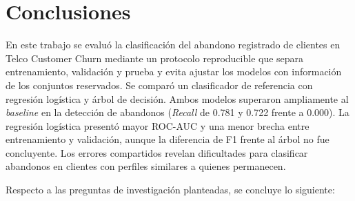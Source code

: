 \section{Conclusiones}
\label{sec:conclusiones}
En este trabajo se evaluó la clasificación del abandono registrado de clientes en Telco Customer Churn
mediante un protocolo reproducible que separa entrenamiento, validación y prueba y evita ajustar
los modelos con información de los conjuntos reservados. Se comparó un clasificador de referencia
con regresión logística y árbol de decisión. Ambos modelos superaron ampliamente al \emph{baseline} en la
detección de abandonos (\emph{Recall} de 0.781 y 0.722 frente a 0.000).
La regresión logística presentó mayor ROC-AUC y una menor brecha entre entrenamiento
y validación, aunque la diferencia de F1 frente al árbol no fue concluyente. Los errores
compartidos revelan dificultades para clasificar abandonos en clientes con perfiles similares
a quienes permanecen.

Respecto a las preguntas de investigación planteadas, se concluye lo siguiente:

